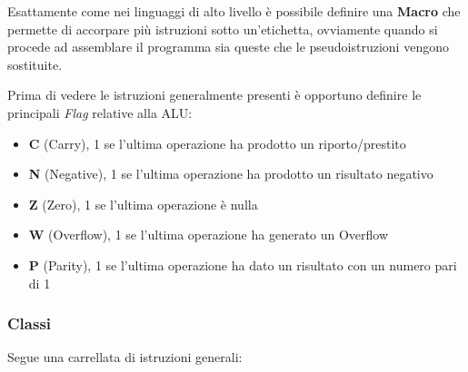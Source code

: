 \documentclass{article}
\begin{document}
\noindent Esattamente come nei linguaggi di alto livello è possibile definire una \textbf{Macro} che permette di accorpare più istruzioni sotto un'etichetta, ovviamente quando si procede ad assemblare il programma sia queste che le pseudoistruzioni vengono sostituite.\newline

\noindent Prima di vedere le istruzioni generalmente presenti è opportuno definire le principali \textit{Flag} relative alla ALU:
\begin{itemize}
    \item \textbf{C} (Carry), 1 se l'ultima operazione ha prodotto un riporto/prestito
    \item \textbf{N} (Negative), 1 se l'ultima operazione ha prodotto un risultato negativo
    \item \textbf{Z} (Zero), 1 se l'ultima operazione è nulla
    \item \textbf{W} (Overflow), 1 se l'ultima operazione ha generato un Overflow
    \item \textbf{P} (Parity), 1 se l'ultima operazione ha dato un risultato con un numero pari di 1
\end{itemize}

\subsubsection{Classi}

Segue una carrellata di istruzioni generali:
\end{document}
